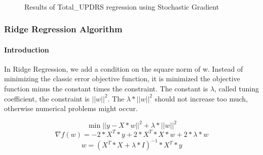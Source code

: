 \documentclass[12pt,a4paper,oneside]{article}
\begin{document}
\begin{figure}[p]
		\\
		\caption{Results of Total\_UPDRS regression using Stochastic Gradient}
		\label{fig:Figure 6}
	\end{figure}

	\subsubsection{Ridge Regression Algorithm}
	\paragraph{Introduction}
	In Ridge Regression, we add a condition on the square norm of w. Instead of minimizing the classic error objective function, it is minimized the objective function minus the constant times the constraint. The constant is $\lambda$, called tuning coefficient, the constraint is $||w||^{2}$. The $\lambda*||w||^{2}$ should not increase too much, otherwise numerical problems might occur.
	
	\begin{equation}
 		\min ||y-X*w||^{2}+\lambda*||w||^{2}
	\end{equation}
	\begin{equation}
		\nabla f(w)=-2*X^{T}*y+2*X^{T}*X*w +2*\lambda*w
	\end{equation}
	\begin{equation}
		w=(X^{T}*X + \lambda*I)^{-1}*X^{T}*y
	\end{equation}
	
\end{document}
